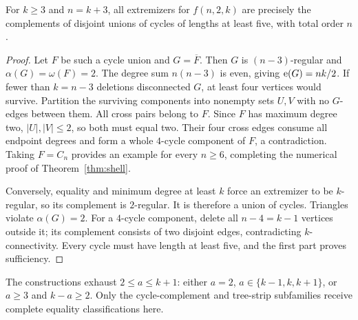\begin{theorem}\label{thm:cycles}
For $k\ge3$ and $n=k+3$, all extremizers for $f(n,2,k)$ are precisely the complements of disjoint unions of cycles of lengths at least five, with total order $n$.
\end{theorem}
\begin{proof}
Let $F$ be such a cycle union and $G=\overline F$.
Then $G$ is $(n-3)$-regular and $\alpha(G)=\omega(F)=2$.
The degree sum $n(n-3)$ is even, giving $\mathrm{e}(G)=nk/2$.
If fewer than $k=n-3$ deletions disconnected $G$, at least four vertices would survive.
Partition the surviving components into nonempty sets $U,V$ with no $G$-edges between them.
All cross pairs belong to $F$.
Since $F$ has maximum degree two, $|U|,|V|\le2$, so both must equal two.
Their four cross edges consume all endpoint degrees and form a whole $4$-cycle component of $F$, a contradiction.
Taking $F=C_n$ provides an example for every $n\ge6$, completing the numerical proof of Theorem~\ref{thm:shell}.

Conversely, equality and minimum degree at least $k$ force an extremizer to be $k$-regular, so its complement is $2$-regular.
It is therefore a union of cycles.
Triangles violate $\alpha(G)=2$.
For a $4$-cycle component, delete all $n-4=k-1$ vertices outside it; its complement consists of two disjoint edges, contradicting $k$-connectivity.
Every cycle must have length at least five, and the first part proves sufficiency.
\end{proof}

The constructions exhaust $2\le a\le k+1$: either $a=2$, $a\in\{k-1,k,k+1\}$, or $a\ge3$ and $k-a\ge2$.
Only the cycle-complement and tree-strip subfamilies receive complete equality classifications here.
